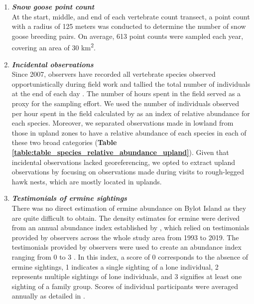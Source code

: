 \documentclass[a4paper,twoside,12pt]{article}
\begin{document}
\begin{enumerate}[label=\roman*]
\begin{figure}
\end{figure}
\newpage
\item[] \textit{\textbf{Snow goose point count}}\\
At the start, middle, and end of each vertebrate count transect, a point count with a radius of 125 meters was conducted to determine the number of snow goose breeding pairs. On average, 613  point counts were sampled each year, covering an area of 30  km\textsuperscript{2}.
\\
\item[] \textit{\textbf{Incidental observations}}\\
Since 2007, observers have recorded all vertebrate species observed opportunistically during field work and tallied the total number of individuals at the end of each day \citep{gauthier2020daily, gauthier2024a}. The number of hours spent in the field served as a proxy for the sampling effort. We used the number of individuals observed per hour spent in the field calculated by \citet{gauthier2024a} as an index of relative abundance for each species. Moreover, we separated observations made in lowland from those in upland zones to have a relative abundance of each species in each of these two broad categories (\textbf{Table \ref{table:table_species_relative_abundance_upland}}). Given that incidental observations lacked georeferencing, we opted to extract upland observations by focusing on observations made during visits to rough-legged hawk nests, which are mostly located in uplands. \\

\newpage
\item[] \textit{\textbf{Testimonials of ermine sightings}}\\
There was no direct estimation of ermine abundance on Bylot Island as they are quite difficult to obtain. The density estimates for ermine were derived from an annual abundance index established by \citet{bolduc2023}, which relied on testimonials provided by observers across the whole study area from 1993 to 2019. The testimonials provided by observers were used to create an abundance index ranging from 0 to 3 \citep{bolduc2023}. In this index, a score of 0 corresponds to the absence of ermine sightings, 1 indicates a single sighting of a lone individual, 2 represents multiple sightings of lone individuals, and 3 signifies at least one sighting of a family group. Scores of individual participants were averaged annually as detailed in \citet{bolduc2023}. 

\end{enumerate}
\end{document}
